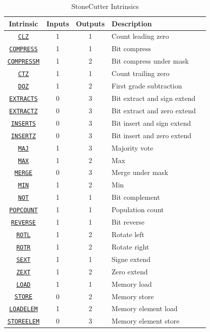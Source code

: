 \documentclass{article}
\begin{document}
\begin{table}[h]
\begin{center}
\caption{StoneCutter Intrinsics}
\vspace{0.125in}
\label{tab:scintrins}
\begin{tabular}{|c|c|c|l|l}
\hline
\textbf{Intrinsic} & \textbf{Inputs} & \textbf{Outputs} & \textbf{Description}\\
\hline
\hyperref[sec:CLZ]{\texttt{CLZ}} & 1 & 1 & Count leading zero\\
\hline
\hyperref[sec:COMPRESS]{\texttt{COMPRESS}} & 1 & 1 & Bit compress\\
\hline
\hyperref[sec:COMPRESSM]{\texttt{COMPRESSM}} & 1 & 2 & Bit compress under mask\\
\hline
\hyperref[sec:CTZ]{\texttt{CTZ}} & 1 & 1 & Count trailing zero\\
\hline
\hyperref[sec:DOZ]{\texttt{DOZ}} & 1 & 2 & First grade subtraction\\
\hline
\hyperref[sec:EXTRACTS]{\texttt{EXTRACTS}} & 0 & 3 & Bit extract and sign extend\\
\hline
\hyperref[sec:EXTRACTZ]{\texttt{EXTRACTZ}} & 0 & 3 & Bit extract and zero extend\\
\hline
\hyperref[sec:INSERTS]{\texttt{INSERTS}} & 0 & 3 & Bit insert and sign extend\\
\hline
\hyperref[sec:INSERTZ]{\texttt{INSERTZ}} & 0 & 3 & Bit insert and zero extend\\
\hline
\hyperref[sec:MAJ]{\texttt{MAJ}} & 1 & 3 & Majority vote\\
\hline
\hyperref[sec:MAX]{\texttt{MAX}} & 1 & 2 & Max\\
\hline
\hyperref[sec:MERGE]{\texttt{MERGE}} & 0 & 3 & Merge under mask\\
\hline
\hyperref[sec:MIN]{\texttt{MIN}} & 1 & 2 & Min\\
\hline
\hyperref[sec:NOT]{\texttt{NOT}} & 1 & 1 & Bit complement\\
\hline
\hyperref[sec:POPCOUNT]{\texttt{POPCOUNT}} & 1 & 1 & Population count\\
\hline
\hyperref[sec:REVERSE]{\texttt{REVERSE}} & 1 & 1 & Bit reverse\\
\hline
\hyperref[sec:ROTL]{\texttt{ROTL}} & 1 & 2 & Rotate left\\
\hline
\hyperref[sec:ROTR]{\texttt{ROTR}} & 1 & 2 & Rotate right\\
\hline
\hyperref[sec:SEXT]{\texttt{SEXT}} & 1 & 1 & Signe extend\\
\hline
\hyperref[sec:ZEXT]{\texttt{ZEXT}} & 1 & 2 & Zero extend\\
\hline
\hyperref[sec:LOAD]{\texttt{LOAD}} & 1 & 1 & Memory load\\
\hline
\hyperref[sec:STORE]{\texttt{STORE}} & 0 & 2 & Memory store\\
\hline
\hyperref[sec:LOADELEM]{\texttt{LOADELEM}} & 1 & 2 & Memory element load\\
\hline
\hyperref[sec:STOREELEM]{\texttt{STOREELEM}} & 0 & 3 & Memory element store\\
\hline
\end{tabular}
\end{center}
\end{table}
\end{document}
